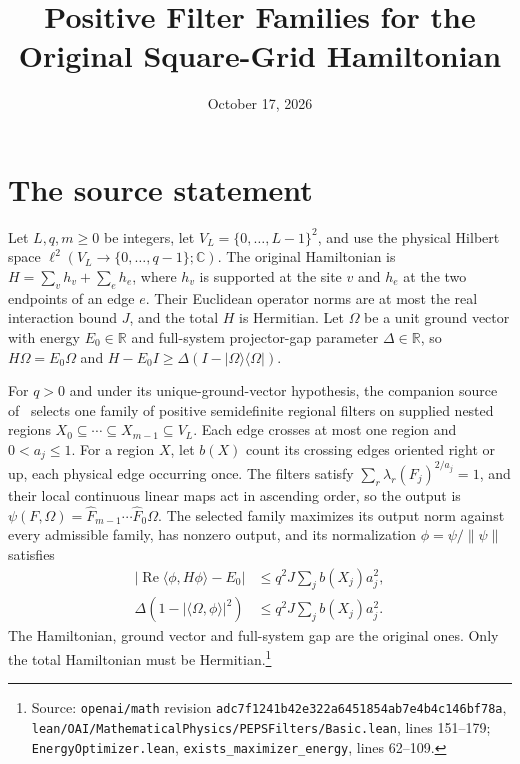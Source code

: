 \documentclass{article}
\title{Positive Filter Families for the Original Square-Grid Hamiltonian}
\author{}
\date{October 17, 2026}
\begin{document}
\maketitle
{}

\section{The source statement}

Let $L,q,m\ge0$ be integers, let $V_L=\{0,\ldots,L-1\}^2$, and use the
physical Hilbert space $\ell^2(V_L\to\{0,\ldots,q-1\};\mathbb C)$.
The original Hamiltonian is $H=\sum_v h_v+\sum_e h_e$, where $h_v$ is
supported at the site $v$ and $h_e$ at the two endpoints of an edge $e$.
Their Euclidean operator norms are at most the real interaction bound $J$,
and the total $H$ is Hermitian. Let $\Omega$ be a unit ground vector with
energy $E_0\in\mathbb R$ and full-system projector-gap parameter
$\Delta\in\mathbb R$, so $H\Omega=E_0\Omega$ and
$H-E_0I\ge\Delta(I-|\Omega\rangle\langle\Omega|)$.

For $q>0$ and under its unique-ground-vector hypothesis, the companion source
of~\cite{OpenAI2026PolynomialPEPS} selects one family of positive semidefinite
regional filters on supplied nested regions
$X_0\subseteq\cdots\subseteq X_{m-1}\subseteq V_L$.
Each edge crosses at most one region and $0<a_j\le1$. For a region $X$,
let $b(X)$ count its crossing edges oriented right or up, each physical edge
occurring once. The filters satisfy
$\sum_r\lambda_r(F_j)^{2/a_j}=1$, and their local continuous linear maps
act in ascending order, so the output is
$\psi(F,\Omega)=\widehat F_{m-1}\cdots\widehat F_0\Omega$.
The selected family maximizes its output norm against every admissible family,
has nonzero output, and its normalization $\phi=\psi/\|\psi\|$ satisfies
\begin{align}
 |\operatorname{Re}\langle\phi,H\phi\rangle-E_0|
 &\le q^2J\sum_j b(X_j)a_j^2,
 \label{eq:polypeps_square_zero_floor_energy_bound}\\
 \Delta(1-|\langle\Omega,\phi\rangle|^2)
 &\le q^2J\sum_j b(X_j)a_j^2.
 \label{eq:polypeps_square_zero_floor_fidelity_bound}
\end{align}
The Hamiltonian, ground vector and full-system gap are the original ones.
Only the total Hamiltonian must be Hermitian.\footnote{Source: \texttt{openai/math} revision
\texttt{adc7f1241b42e322a6451854ab7e4b4c146bf78a},
\texttt{lean/OAI/MathematicalPhysics/PEPSFilters/Basic.lean}, lines 151--179;
\texttt{EnergyOptimizer.lean}, \texttt{exists\_maximizer\_energy}, lines 62--109.}
\end{document}

